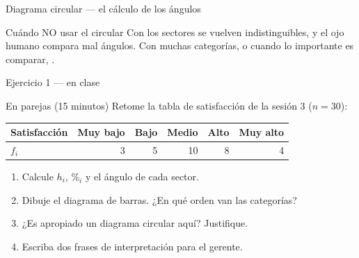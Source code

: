 \documentclass[aspectratio=169,10pt]{beamer}
\begin{document}
\begin{frame}{Diagrama circular — el cálculo de los ángulos}
  \vspace{0.1cm}
  \begin{alertblock}{Cuándo NO usar el circular}
    \scriptsize
    Con  los sectores se vuelven
    indistinguibles, y el ojo humano compara mal ángulos. Con muchas
    categorías, o cuando lo importante es comparar, .
  \end{alertblock}
\end{frame}

\begin{frame}{Ejercicio 1 — en clase}
  \begin{alertblock}{En parejas (15 minutos)}
    \footnotesize
    Retome la tabla de satisfacción de la sesión 3 ($n = 30$):

    \vspace{0.15cm}
    \centering\scriptsize
    \begin{tabular}{@{}lrrrrr@{}}
      \toprule
      \textbf{Satisfacción} & Muy bajo & Bajo & Medio & Alto & Muy alto \\
      \midrule
      \textbf{$f_i$} & 3 & 5 & 10 & 8 & 4 \\
      \bottomrule
    \end{tabular}

    \vspace{0.25cm}
    \raggedright
    \begin{enumerate}\setlength{\itemsep}{-0.05cm}
      \item Calcule $h_i$, $\%_i$ y el ángulo de cada sector.
      \item Dibuje el diagrama de barras. ¿En qué orden van las categorías?
      \item ¿Es apropiado un diagrama circular aquí? Justifique.
      \item Escriba dos frases de interpretación para el gerente.
    \end{enumerate}
  \end{alertblock}
\end{frame}
\end{document}
